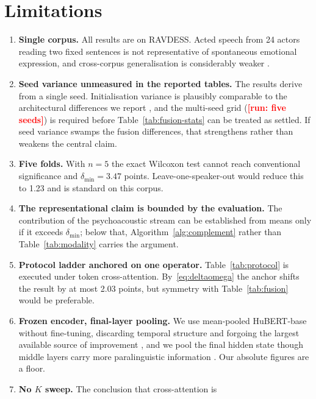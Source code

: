 \documentclass[journal,onecolumn,11pt,draftclsnofoot]{IEEEtran}   %
\newcommand{\TORUN}[1]{\textcolor{red}{\textbf{[run: #1]}}}
\newcommand{\TORUN}[1]{}
\begin{document}
\section{Limitations}
\label{sec:limitations}
\begin{enumerate}
  \item \textbf{Single corpus.} All results are on RAVDESS. Acted speech from 24
    actors reading two fixed sentences is not representative of spontaneous
    emotional expression, and cross-corpus generalisation is considerably weaker
    \cite{portal2025benchmarking}.
  \item \textbf{Seed variance unmeasured in the reported tables.} The results
    derive from a single seed. Initialisation variance is plausibly comparable
    to the architectural differences we report \cite{bouthillier2021variance},
    and the multi-seed grid (\TORUN{five seeds}) is required before
    Table~\ref{tab:fusion-stats} can be treated as settled. If seed variance
    swamps the fusion differences, that strengthens rather than weakens the
    central claim.
  \item \textbf{Five folds.} With $n = 5$ the exact Wilcoxon test cannot reach
    conventional significance and $\delta_{\min} = 3.47$ points.
    Leave-one-speaker-out would reduce this to 1.23 and is standard on this
    corpus.
  \item \textbf{The representational claim is bounded by the evaluation.} The
    contribution of the psychoacoustic stream can be established from means only
    if it exceeds $\delta_{\min}$; below that, Algorithm~\ref{alg:complement}
    rather than Table~\ref{tab:modality} carries the argument.
  \item \textbf{Protocol ladder anchored on one operator.} Table~\ref{tab:protocol}
    is executed under token cross-attention. By~\eqref{eq:deltaomega} the anchor
    shifts the result by at most 2.03 points, but symmetry with
    Table~\ref{tab:fusion} would be preferable.
  \item \textbf{Frozen encoder, final-layer pooling.} We use mean-pooled
    HuBERT-base without fine-tuning, discarding temporal structure and forgoing
    the largest available source of improvement \cite{chen2023exploring}, and we
    pool the final hidden state though middle layers carry more paralinguistic
    information \cite{pasad2023comparative,chiu2025probing}. Our absolute
    figures are a floor.
  \item \textbf{No $K$ sweep.} The conclusion that cross-attention is

\end{enumerate}
\end{document}
